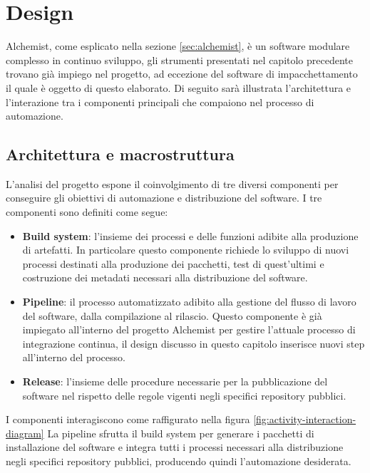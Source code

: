 \chapter{Design}
Alchemist, come esplicato nella sezione \ref{sec:alchemist}, è un software modulare complesso in continuo sviluppo, gli strumenti presentati nel capitolo precedente trovano già impiego nel progetto, ad eccezione del software di impacchettamento il quale è oggetto di questo elaborato. Di seguito sarà illustrata l'architettura e l'interazione tra i componenti principali che compaiono nel processo di automazione.

\section{Architettura e macrostruttura}
L'analisi del progetto espone il coinvolgimento di tre diversi componenti per conseguire gli obiettivi di automazione e distribuzione del software. I tre componenti sono definiti come segue: 
\begin{itemize}
	\item \textbf{Build system}: l'insieme dei processi e delle funzioni adibite alla produzione di artefatti. In particolare questo componente richiede lo sviluppo di nuovi processi destinati alla produzione dei pacchetti, test di quest'ultimi e costruzione dei metadati necessari alla distribuzione del software.
	\item \textbf{Pipeline}: il processo automatizzato adibito alla gestione del flusso di lavoro del software, dalla compilazione al rilascio. Questo componente è già impiegato all'interno del progetto Alchemist per gestire l'attuale processo di integrazione continua, il design discusso in questo capitolo inserisce nuovi step all'interno del processo.
	\item \textbf{Release}: l'insieme delle procedure necessarie per la pubblicazione del software nel rispetto delle regole vigenti negli specifici repository pubblici.
\end{itemize}
I componenti interagiscono come raffigurato nella figura \ref{fig:activity-interaction-diagram} La pipeline sfrutta il build system per generare i pacchetti di installazione del software e integra tutti i processi necessari alla distribuzione negli specifici repository pubblici, producendo quindi l'automazione desiderata.
